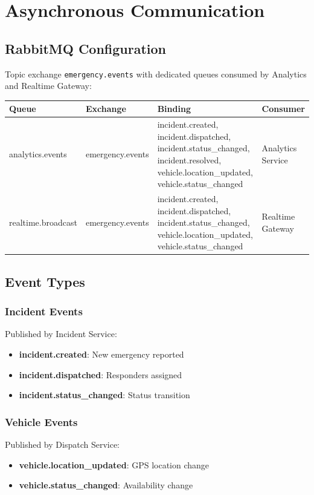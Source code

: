 \documentclass[12pt,a4paper]{report}
\begin{document}
\chapter{Asynchronous Communication}

\section{RabbitMQ Configuration}

Topic exchange \texttt{emergency.events} with dedicated queues consumed by Analytics and Realtime Gateway:

\begin{table}[H]
\centering\small
\begin{tabular}{|l|l|l|l|}
\hline
\textbf{Queue} & \textbf{Exchange} & \textbf{Binding} & \textbf{Consumer} \\
\hline
analytics.events & emergency.events & incident.created, incident.dispatched, incident.status\_changed, incident.resolved, vehicle.location\_updated, vehicle.status\_changed & Analytics Service \\
\hline
realtime.broadcast & emergency.events & incident.created, incident.dispatched, incident.status\_changed, vehicle.location\_updated, vehicle.status\_changed & Realtime Gateway \\
\hline
\end{tabular}
\end{table}

\section{Event Types}

\subsection{Incident Events}
Published by Incident Service:
\begin{itemize}
	\item \textbf{incident.created}: New emergency reported
	\item \textbf{incident.dispatched}: Responders assigned
	\item \textbf{incident.status\_changed}: Status transition
\end{itemize}

\subsection{Vehicle Events}
Published by Dispatch Service:
\begin{itemize}
	\item \textbf{vehicle.location\_updated}: GPS location change
	\item \textbf{vehicle.status\_changed}: Availability change
\end{itemize}
\end{document}
